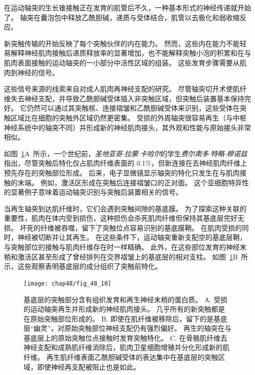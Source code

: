 在运动轴突的生长锥接触正在发育的肌管后不久，一种基本形式的神经传递就开始了。
轴突在囊泡包中释放乙酰胆碱，递质与受体结合，肌管以去极化和弱收缩反应。


新突触传输的开始反映了每个突触伙伴的内在能力。
然而，这些内在能力不能轻易解释神经肌肉接触后递质释放率的显著增加，也不能解释突触小泡的积累和在与肌肉表面接触的运动轴突的一小部分中活性区域的组装。
这些发育步骤需要从肌肉到神经的信号。


这些信号来源的线索来自对成人肌肉再神经支配的研究。
尽管轴突切开术使肌纤维失去神经支配，并导致乙酰胆碱受体插入非突触区域，但突触后装置基本保持完好。
它仍然可以通过其突触核、连接褶皱和乙酰胆碱受体来识别，这些受体在突触区域比在细胞的突触外区域仍然更密集。
受损的外周轴突很容易再生（与中枢神经系统中的轴突不同）并形成新的神经肌肉接头，其外观和性能与原始接头非常相似。


如图~\ref{fig:48_10}A~所示，一个世纪前，\textit{圣地亚哥$\cdot$拉蒙$\cdot$卡哈尔}的学生\textit{费尔南多$\cdot$特略-穆诺兹}指出，尽管突触后特化仅占肌肉纤维表面的 0.1\%，但新连接在去神经肌肉纤维上预先存在的突触部位形成。
后来，电子显微镜显示轴突的特化只发生在与肌肉接触的末端。
例如，激活区形成在突触后连接褶皱口的正对面。
这个亚细胞特异性的显著例子意味着运动轴突识别与突触后装置相关的信号。


当再生轴突到达肌纤维时，它们会遇到突触间隙的基底膜。
为了探索这种关联的重要性，肌肉在体内受到损伤，这种损伤会杀死肌肉纤维但保持其基底层完好无损。
坏死的纤维被吞噬，留下了突触位点容易识别的基底膜鞘。
在肌肉受损的同时，神经被切断并让其再生。
在这些条件下，运动轴突重新支配空的基底层鞘，与突触部位的接触与肌肉纤维存在时一样精确。
此外，在这些部位发育的神经末梢和激活区甚至形成了曾经排列在交界褶皱上的基底层的相对支柱。
如图~\ref{fig:48_10}B~所示，这些观察表明基底层的成分组织了突触前特化。


\begin{figure}[htbp]
	\centering
	\texttt{[image: chap48/fig\_48\_10]}
	\caption{基底层的突触部分含有组织发育和再生神经末梢的蛋白质。
		A. 受损的运动轴突再生并形成新的神经肌肉接头。
		几乎所有的新突触都是在原始突触部位形成的\cite{glicksman1983differentiation}。
		B. 即使在肌纤维被移除后，留下的是基底层“幽灵”，对原始突触部位神经支配仍有强烈偏好。
		再生的轴突在与基底层上的原始突触位点接触时发育突触特化\cite{glicksman1983differentiation}。
		C. 在骨骼肌纤维去神经支配和成熟肌纤维消除后，肌肉卫星细胞增殖并分化形成新的肌纤维。
		再生肌纤维表面乙酰胆碱受体的表达集中在基底层的突触区域，即使神经再支配被阻止也是如此\cite{burden1979acetylcholine}。}
	\label{fig:48_10}
\end{figure}


